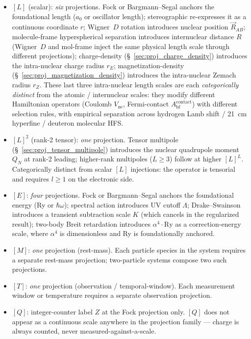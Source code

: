 \documentclass[11pt]{article}
\begin{document}
\begin{itemize}\setlength\itemsep{0pt}
\item $[L]$ (scalar): \emph{six} projections.  Fock or
Bargmann--Segal anchors the foundational length ($a_0$ or oscillator
length); stereographic re-expresses it as a continuous coordinate
$r$; Wigner~$D$ rotation introduces nuclear position
$\vec{R}_{AB}$; molecule-frame hyperspherical separation introduces
internuclear distance $R$ (Wigner~$D$ and mol-frame inject the same
physical length scale through different projections);
charge-density (\S~\ref{sec:proj_charge_density}) introduces the
intra-nuclear charge radius $r_E$; magnetization-density
(\S~\ref{sec:proj_magnetization_density}) introduces the
intra-nuclear Zemach radius $r_Z$.  These last three intra-nuclear
length scales are each \emph{categorically distinct} from the
atomic / internuclear scales: they modify different Hamiltonian
operators (Coulomb $V_\text{ne}$, Fermi-contact
$A_\text{hf}^\text{contact}$) with different selection rules, with
empirical separation across hydrogen Lamb shift / 21~cm hyperfine /
deuteron molecular HFS.

\item $[L]^2$ (rank-2 tensor): \emph{one} projection.  Tensor
multipole (\S~\ref{sec:proj_tensor_multipole}) introduces the
nuclear quadrupole moment $Q_N$ at rank-2 leading; higher-rank
multipoles ($L \geq 3$) follow at higher $[L]^L$.  Categorically
distinct from scalar $[L]$ injections: the operator is tensorial
and requires $l \geq 1$ on the electronic side.
\item $[E]$: \emph{four} projections.  Fock or Bargmann--Segal
anchors the foundational energy (Ry or $\hbar\omega$); spectral
action introduces UV cutoff $\Lambda$; Drake--Swainson introduces a
transient subtraction scale $K$ (which cancels in the regularized
result); two-body Breit retardation introduces $\alpha^4 \cdot
\mathrm{Ry}$ as a correction-energy scale, where $\alpha^4$ is
dimensionless and Ry is foundationally anchored.
\item $[M]$: \emph{one} projection (rest-mass).  Each particle
species in the system requires a separate rest-mass projection;
two-particle systems compose two such projections.
\item $[T]$: \emph{one} projection (observation /
temporal-window).  Each measurement window or temperature requires
a separate observation projection.
\item $[Q]$: integer-counter label $Z$ at the Fock projection only.
$[Q]$ does not appear as a continuous scale anywhere in the
projection family --- charge is always counted, never
measured-against-a-scale.
\end{itemize}
\end{document}
